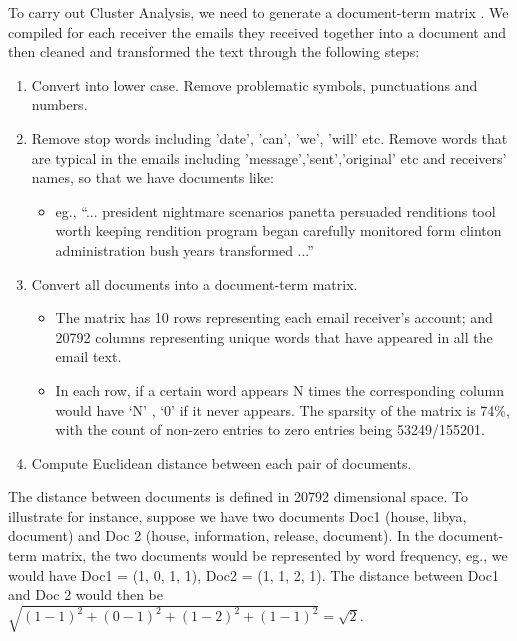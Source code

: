 To carry out Cluster Analysis, we need to generate a document-term matrix \cite{document-term2015}. 
We compiled for each receiver the emails they received together into a document and then cleaned and transformed the text through the following steps:
\begin{enumerate}
\item Convert into lower case. Remove problematic symbols, punctuations and numbers.
\item Remove stop words including 'date', 'can', 'we', 'will' etc. Remove words that are typical in the emails including 'message','sent','original' etc and receivers' names, so that we have documents like:
\begin{itemize}
\item eg., ``... president nightmare scenarios panetta persuaded renditions tool worth keeping rendition program began carefully monitored form clinton administration bush years transformed ...''
\end{itemize}
\item Convert all documents into a document-term matrix.
\begin{itemize} 
\item The matrix has 10 rows representing each email receiver's account; and 20792 columns representing unique words that have appeared in all the email text.
\item In each row, if a certain word appears N times the corresponding column would have `N' , `0' if it never appears. The sparsity of the matrix is 74\%, with the count of non-zero entries to zero entries being 53249/155201. 
\end{itemize}
\item Compute Euclidean distance between each pair of documents.
\end{enumerate}
The distance between documents is defined in 20792 dimensional space. To illustrate for instance, suppose we have two documents Doc1 (house, libya, document) and Doc 2 (house, information, release, document). In the document-term matrix, the two documents would be represented by word frequency, eg., we would have Doc1 = (1, 0, 1, 1), Doc2 = (1, 1, 2, 1). The distance between Doc1 and Doc 2 would then be $\sqrt{(1-1)^{2} + (0-1)^{2} + (1-2)^{2} + (1-1)^{2}} = \sqrt{2}$.

